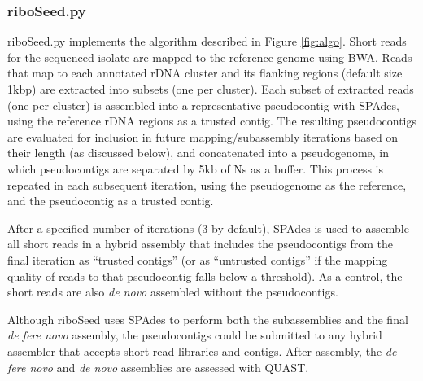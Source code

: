 \documentclass[10pt]{article}
\begin{document}
\begin{linenumbers}
\subsubsection*{riboSeed.py}
riboSeed.py implements the algorithm described in Figure \ref{fig:algo}. Short reads for the sequenced isolate are mapped to the reference genome using BWA\cite{Li 2009}. Reads that map to each annotated rDNA cluster and its flanking regions (default size 1kbp) are extracted into subsets (one per cluster). Each subset of extracted reads (one per cluster) is assembled into a representative pseudocontig with SPAdes\cite{Bankevich2012}, using the reference rDNA regions as a trusted contig. The resulting pseudocontigs are evaluated for inclusion in future mapping/subassembly iterations based on their length (as discussed below), and concatenated into a pseudogenome, in which pseudocontigs are separated by 5kb of Ns as a buffer. This process is repeated in each subsequent iteration, using the pseudogenome as the reference, and the pseudocontig as a trusted contig.


After a specified number of iterations (3 by default), SPAdes is used to assemble all short reads in a hybrid assembly that includes the pseudocontigs from the final iteration as ``trusted contigs'' (or as ``untrusted contigs'' if the mapping quality of reads to that pseudocontig falls below a threshold). As a control, the short reads are also \textit{de novo} assembled without the pseudocontigs.


Although riboSeed uses SPAdes to perform both the subassemblies and the final \textit{de fere novo} assembly, the pseudocontigs could be submitted to any hybrid assembler that accepts short read libraries and contigs. After assembly, the \textit{de fere novo} and \textit{de novo} assemblies are assessed with QUAST\cite{Gurevich2013}.


\end{linenumbers}
\end{document}
